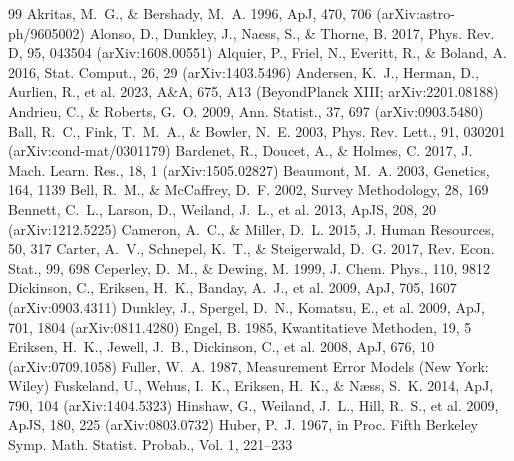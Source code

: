 \begin{thebibliography}{99}
 Akritas, M.~G., \& Bershady, M.~A. 1996, ApJ, 470, 706 (arXiv:astro-ph/9605002)
 Alonso, D., Dunkley, J., Naess, S., \& Thorne, B. 2017, Phys. Rev. D, 95, 043504 (arXiv:1608.00551)
 Alquier, P., Friel, N., Everitt, R., \& Boland, A. 2016, Stat. Comput., 26, 29 (arXiv:1403.5496)
 Andersen, K.~J., Herman, D., Aurlien, R., et al. 2023, A\&A, 675, A13 (BeyondPlanck XIII; arXiv:2201.08188)
 Andrieu, C., \& Roberts, G.~O. 2009, Ann. Statist., 37, 697 (arXiv:0903.5480)
 Ball, R.~C., Fink, T.~M.~A., \& Bowler, N.~E. 2003, Phys. Rev. Lett., 91, 030201 (arXiv:cond-mat/0301179)
 Bardenet, R., Doucet, A., \& Holmes, C. 2017, J. Mach. Learn. Res., 18, 1 (arXiv:1505.02827)
 Beaumont, M.~A. 2003, Genetics, 164, 1139
 Bell, R.~M., \& McCaffrey, D.~F. 2002, Survey Methodology, 28, 169
 Bennett, C.~L., Larson, D., Weiland, J.~L., et al. 2013, ApJS, 208, 20 (arXiv:1212.5225)
 Cameron, A.~C., \& Miller, D.~L. 2015, J. Human Resources, 50, 317
 Carter, A.~V., Schnepel, K.~T., \& Steigerwald, D.~G. 2017, Rev. Econ. Stat., 99, 698
 Ceperley, D.~M., \& Dewing, M. 1999, J. Chem. Phys., 110, 9812
 Dickinson, C., Eriksen, H.~K., Banday, A.~J., et al. 2009, ApJ, 705, 1607 (arXiv:0903.4311)
 Dunkley, J., Spergel, D.~N., Komatsu, E., et al. 2009, ApJ, 701, 1804 (arXiv:0811.4280)
 Engel, B. 1985, Kwantitatieve Methoden, 19, 5
 Eriksen, H.~K., Jewell, J.~B., Dickinson, C., et al. 2008, ApJ, 676, 10 (arXiv:0709.1058)
 Fuller, W.~A. 1987, Measurement Error Models (New York: Wiley)
 Fuskeland, U., Wehus, I.~K., Eriksen, H.~K., \& N{\ae}ss, S.~K. 2014, ApJ, 790, 104 (arXiv:1404.5323)
 Hinshaw, G., Weiland, J.~L., Hill, R.~S., et al. 2009, ApJS, 180, 225 (arXiv:0803.0732)
 Huber, P.~J. 1967, in Proc. Fifth Berkeley Symp. Math. Statist. Probab., Vol. 1, 221--233

\end{thebibliography}
